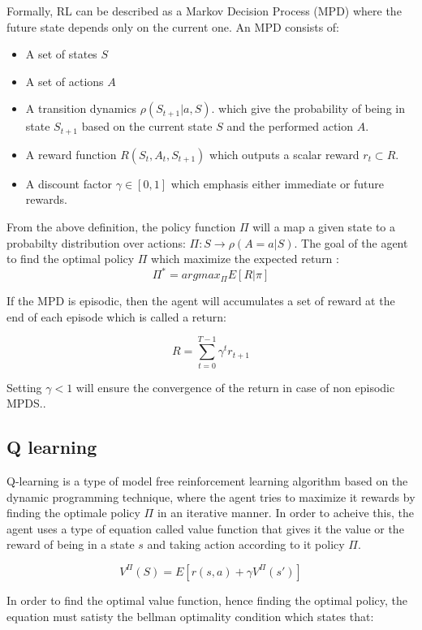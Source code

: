 \documentclass[12pt]{extarticle}
\begin{document}
Formally, RL can be described as a Markov Decision Process (MPD) where the future state depends only on the current one. An MPD  consists of:

\begin{itemize}
  \item  A set of states $S$
  \item  A set of actions $A$
  \item  A transition dynamics $\rho(S_{t+1}|a,S)$. which give the probability of being in state $S_{t+1}$ based on the current state $S$ and the performed action $A$.
  \item A reward function $R(S_{t},A_{t},S_{t+1})$ which outputs a scalar reward $r_{t} \subset R$. 
   \item A discount factor $\gamma \in [0,1]$ which  emphasis either  immediate or future rewards.
\end{itemize}

\newpage
From the above definition, the policy function $\Pi$ will  a map a given state to a probabilty distribution over actions: $\Pi: S \longrightarrow \rho(A=a|S)$.
The goal of the agent to find the optimal policy $\Pi$ which maximize the expected return :\\
\[ \Pi^{*} = argmax_{\Pi}  E[R|\pi] \]

If the MPD is episodic, then the agent will accumulates a set of reward at the end of each episode which is called a return:

\[ R= \sum_{t=0}^{T-1} \gamma^{t}r_{t+1} \]

Setting $\gamma<1$ will ensure the convergence of the return in case of non episodic MPDS.\cite{arulkumaran2017brief}.

\subsection{Q learning}
Q-learning is a type of model free reinforcement learning algorithm  based on the dynamic programming technique, where the agent tries to maximize it rewards by finding the optimale policy $\Pi$ in an iterative manner. In order to  acheive this, the agent uses a type of equation called value function that gives it the value or the reward of being in a state $s$ and taking action according to it policy $\Pi$.


\[ V^{\Pi}(S)=E[r(s,a)+\gamma V^{\Pi}(s') ] \] 

In order to find the optimal value function, hence finding the optimal policy, the equation must satisty the bellman optimality condition which states that: 
\end{document}
